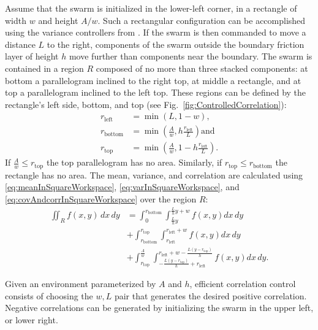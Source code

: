  Assume that the swarm is initialized in the lower-left corner, in a rectangle of width $w$ and height $A/w$. 
 Such a rectangular configuration can be accomplished using the variance controllers from \cite{ShahrokhiIROS2015}. 
  If the swarm is then commanded to move a distance $L$ to the right, components of the swarm outside the boundary friction layer of height $h$ move further than components near the boundary. 
   The swarm is contained in a region $R$ composed of no more than three stacked components: at bottom a parallelogram inclined to the right top, at middle a rectangle, and at top a parallelogram inclined to the left top. These regions can be defined by the rectangle's left side, bottom, and top (see Fig.~\ref{fig:ControlledCorrelation}):
\begin{align}
r_{\text{left}} &= \min \left(L,1-w \right),\nonumber \\
r_{\text{bottom}} &=\min \left(\frac{A}{w}, h\frac{r_{\textrm{left}}}{L}  \right) \text{and}\nonumber \\
r_{\text{top}}  &= \min \left(\frac{A}{w}, 1-h\frac{r_{\text{left}}}{L}  \right).
\end{align}
If $\frac{A}{w} \le r_{\text{top}}$ the top parallelogram has no area. 
 Similarly, if $r_{\text{top}} \le r_{\text{bottom}}$ the rectangle has no area. 
The mean, variance, and correlation are calculated  using \eqref{eq:meanInSquareWorkspace}, \eqref{eq:varInSquareWorkspace}, and \eqref{eq:covAndcorrInSquareWorkspace} over the region $R$:
\begin{align} \iint_R f(x,y) \, dx \,dy &=  \int_0^{r_{\text{bottom}}}  \int_{\frac{L}{h}y}^{\frac{L}{h}y+w}  f(x,y)  dx \, dy \label{eq:correlationFriction} \\
&+\int_{r_{\text{bottom}}}^{r_{\text{top}}} \int_{r_{\text{left}}}^{r_{\text{left}} +w} f(x,y)    dx \, dy \nonumber\\
&+\int_{r_{\text{top}}}^{\frac{A}{w}} \int_{-\frac{L (y-r_{\text{top}})}{h}+r_{\text{left}}}^{r_{\text{left}}+w-\frac{L (y-r_{\text{top}})}{h}} f(x,y)   dx \, dy .\nonumber
\end{align}
 
 Given an environment parameterized by $A$ and $h$, efficient correlation control consists of choosing the $w,L$ pair  that generates the desired positive correlation.
  Negative correlations can be generated by initializing the swarm in the upper left, or lower right.

